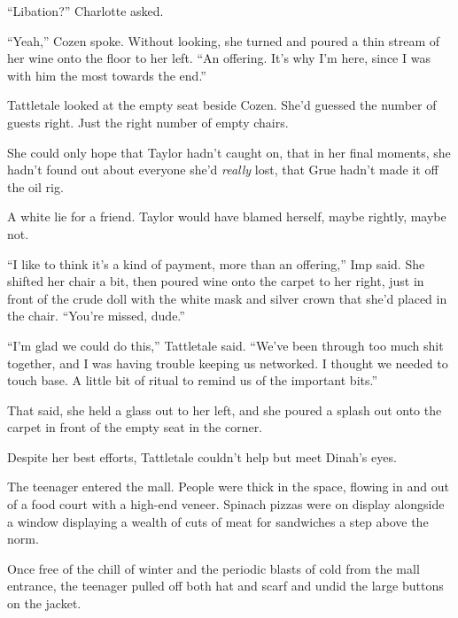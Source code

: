 ``Libation?'' Charlotte asked.



``Yeah,'' Cozen spoke.  Without looking, she turned and poured a thin stream of her wine onto the floor to her left.  ``An offering.  It's why I'm here, since I was with him the most towards the end.''



Tattletale looked at the empty seat beside Cozen.  She'd guessed the number of guests right.  Just the right number of empty chairs.



She could only hope that Taylor hadn't caught on, that in her final moments, she hadn't found out about everyone she'd \emph{really} lost, that Grue hadn't made it off the oil rig.



A white lie for a friend.  Taylor would have blamed herself, maybe rightly, maybe not.



``I like to think it's a kind of payment, more than an offering,'' Imp said.  She shifted her chair a bit, then poured wine onto the carpet to her right, just in front of the crude doll with the white mask and silver crown that she'd placed in the chair.  ``You're missed, dude.''



``I'm glad we could do this,'' Tattletale said.  ``We've been through too much shit together, and I was having trouble keeping us networked.  I thought we needed to touch base.  A little bit of ritual to remind us of the important bits.''



That said, she held a glass out to her left, and she poured a splash out onto the carpet in front of the empty seat in the corner.



Despite her best efforts, Tattletale couldn't help but meet Dinah's eyes.



\blacksquare



The teenager entered the mall.  People were thick in the space, flowing in and out of a food court with a high-end veneer.  Spinach pizzas were on display alongside a window displaying a wealth of cuts of meat for sandwiches a step above the norm.



Once free of the chill of winter and the periodic blasts of cold from the mall entrance, the teenager pulled off both hat and scarf and undid the large buttons on the jacket.



